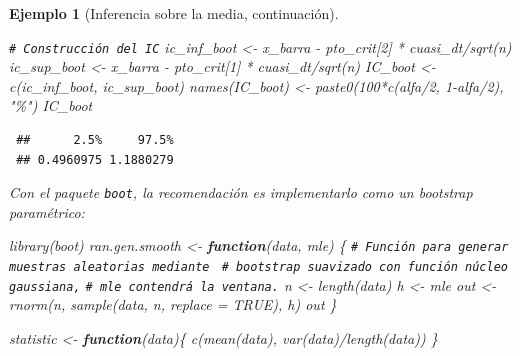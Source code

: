 \documentclass[
]{book}
\newenvironment{Shaded}{\begin{snugshade}}{\end{snugshade}}
\newcommand{\AttributeTok}[1]{\textcolor[rgb]{0.77,0.63,0.00}{#1}}
\newcommand{\CommentTok}[1]{\textcolor[rgb]{0.56,0.35,0.01}{\textit{#1}}}
\newcommand{\ConstantTok}[1]{\textcolor[rgb]{0.00,0.00,0.00}{#1}}
\newcommand{\ControlFlowTok}[1]{\textcolor[rgb]{0.13,0.29,0.53}{\textbf{#1}}}
\newcommand{\DecValTok}[1]{\textcolor[rgb]{0.00,0.00,0.81}{#1}}
\newcommand{\FunctionTok}[1]{\textcolor[rgb]{0.00,0.00,0.00}{#1}}
\newcommand{\NormalTok}[1]{#1}
\newcommand{\OtherTok}[1]{\textcolor[rgb]{0.56,0.35,0.01}{#1}}
\newcommand{\SpecialCharTok}[1]{\textcolor[rgb]{0.00,0.00,0.00}{#1}}
\newcommand{\StringTok}[1]{\textcolor[rgb]{0.31,0.60,0.02}{#1}}
\theoremstyle{break}
\newtheorem{example}{Ejemplo}[chapter]
\theoremstyle{nonumberplain}
\renewcommand{\CommentTok}[1]{\textcolor[rgb]{0.41,0.41,0.41}{\texttt{#1}}}
\begin{document}
\begin{example}[Inferencia sobre la media, continuación]
\begin{Shaded}
\begin{Highlighting}[]
\CommentTok{\# Construcción del IC}
\NormalTok{ic\_inf\_boot }\OtherTok{\textless{}{-}}\NormalTok{ x\_barra }\SpecialCharTok{{-}}\NormalTok{ pto\_crit[}\DecValTok{2}\NormalTok{] }\SpecialCharTok{*}\NormalTok{ cuasi\_dt}\SpecialCharTok{/}\FunctionTok{sqrt}\NormalTok{(n)}
\NormalTok{ic\_sup\_boot }\OtherTok{\textless{}{-}}\NormalTok{ x\_barra }\SpecialCharTok{{-}}\NormalTok{ pto\_crit[}\DecValTok{1}\NormalTok{] }\SpecialCharTok{*}\NormalTok{ cuasi\_dt}\SpecialCharTok{/}\FunctionTok{sqrt}\NormalTok{(n)}
\NormalTok{IC\_boot }\OtherTok{\textless{}{-}} \FunctionTok{c}\NormalTok{(ic\_inf\_boot, ic\_sup\_boot)}
\FunctionTok{names}\NormalTok{(IC\_boot) }\OtherTok{\textless{}{-}} \FunctionTok{paste0}\NormalTok{(}\DecValTok{100}\SpecialCharTok{*}\FunctionTok{c}\NormalTok{(alfa}\SpecialCharTok{/}\DecValTok{2}\NormalTok{, }\DecValTok{1}\SpecialCharTok{{-}}\NormalTok{alfa}\SpecialCharTok{/}\DecValTok{2}\NormalTok{), }\StringTok{"\%"}\NormalTok{)}
\NormalTok{IC\_boot}
\end{Highlighting}
\end{Shaded}

\begin{verbatim}
 ##      2.5%     97.5% 
 ## 0.4960975 1.1880279
\end{verbatim}

Con el paquete \texttt{boot}, la recomendación es implementarlo como
un bootstrap paramétrico:

\begin{Shaded}
\begin{Highlighting}[]
\FunctionTok{library}\NormalTok{(boot)}
\NormalTok{ran.gen.smooth }\OtherTok{\textless{}{-}} \ControlFlowTok{function}\NormalTok{(data, mle) \{}
    \CommentTok{\# Función para generar muestras aleatorias mediante }
    \CommentTok{\# bootstrap suavizado con función núcleo gaussiana,}
    \CommentTok{\# mle contendrá la ventana.}
\NormalTok{    n }\OtherTok{\textless{}{-}} \FunctionTok{length}\NormalTok{(data)}
\NormalTok{    h }\OtherTok{\textless{}{-}}\NormalTok{ mle}
\NormalTok{    out }\OtherTok{\textless{}{-}} \FunctionTok{rnorm}\NormalTok{(n, }\FunctionTok{sample}\NormalTok{(data, n, }\AttributeTok{replace =} \ConstantTok{TRUE}\NormalTok{), h)}
\NormalTok{    out}
\NormalTok{\}}

\NormalTok{statistic }\OtherTok{\textless{}{-}} \ControlFlowTok{function}\NormalTok{(data)\{}
    \FunctionTok{c}\NormalTok{(}\FunctionTok{mean}\NormalTok{(data), }\FunctionTok{var}\NormalTok{(data)}\SpecialCharTok{/}\FunctionTok{length}\NormalTok{(data))}
\NormalTok{\}}


\end{Highlighting}
\end{Shaded}
\end{example}
\end{document}

